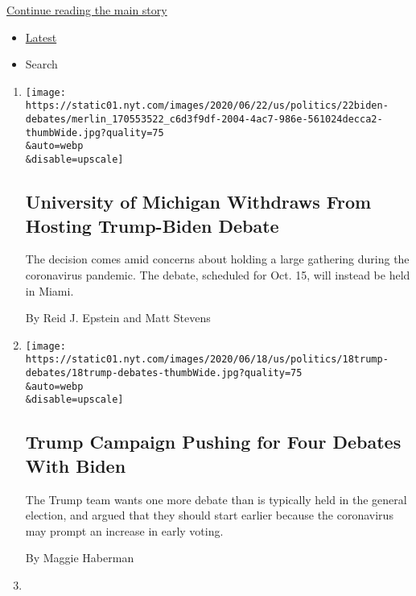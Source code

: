 \protect\hyperlink{after-mid1}{Continue reading the main story}

\begin{itemize}
\tightlist
\item
  \protect\hyperlink{stream-panel}{Latest}
\item
  Search
\end{itemize}

\begin{enumerate}
\def\labelenumi{\arabic{enumi}.}
\item
  \href{/2020/06/22/us/politics/trump-vs-biden-presidential-debates.html}{}

  \texttt{[image: https://static01.nyt.com/images/2020/06/22/us/politics/22biden-debates/merlin\_170553522\_c6d3f9df-2004-4ac7-986e-561024decca2-thumbWide.jpg?quality=75\\\&auto=webp\\\&disable=upscale]}

  \hypertarget{university-of-michigan-withdraws-from-hosting-trump-biden-debate}{%
  \subsection{University of Michigan Withdraws From Hosting Trump-Biden
  Debate}\label{university-of-michigan-withdraws-from-hosting-trump-biden-debate}}

  The decision comes amid concerns about holding a large gathering
  during the coronavirus pandemic. The debate, scheduled for Oct. 15,
  will instead be held in Miami.

  By Reid J. Epstein and Matt Stevens
\item
  \href{/2020/06/18/us/politics/trump-presidential-debates-2020.html}{}

  \texttt{[image: https://static01.nyt.com/images/2020/06/18/us/politics/18trump-debates/18trump-debates-thumbWide.jpg?quality=75\\\&auto=webp\\\&disable=upscale]}

  \hypertarget{trump-campaign-pushing-for-four-debates-with-biden}{%
  \subsection{Trump Campaign Pushing for Four Debates With
  Biden}\label{trump-campaign-pushing-for-four-debates-with-biden}}

  The Trump team wants one more debate than is typically held in the
  general election, and argued that they should start earlier because
  the coronavirus may prompt an increase in early voting.

  By Maggie Haberman
\item
  \href{/2020/05/11/us/politics/joe-biden-sarah-palin-2008.html}{}


\end{enumerate}
